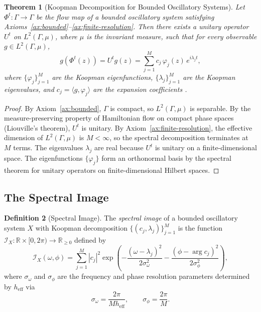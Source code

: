 \documentclass[11pt,twocolumn,a4paper]{article}
\newtheorem{theorem}{Theorem}[section]
\theoremstyle{definition}
\newtheorem{definition}[theorem]{Definition}
\theoremstyle{remark}
\newcommand{\R}{\mathbb{R}}
\begin{document}
\begin{theorem}[Koopman Decomposition for Bounded Oscillatory Systems]\label{thm:koopman}
Let $\Phi^t : \Gamma \to \Gamma$ be the flow map of a bounded oscillatory system satisfying Axioms~\ref{ax:bounded}--\ref{ax:finite-resolution}.  Then there exists a unitary operator $U^t$ on $L^2(\Gamma, \mu)$, where $\mu$ is the invariant measure, such that for every observable $g \in L^2(\Gamma, \mu)$,
\begin{equation}\label{eq:koopman}
    g(\Phi^t(z)) = U^t g(z) = \sum_{j=1}^{M} c_j \, \varphi_j(z) \, e^{i\lambda_j t},
\end{equation}
where $\{\varphi_j\}_{j=1}^M$ are the Koopman eigenfunctions, $\{\lambda_j\}_{j=1}^M$ are the Koopman eigenvalues, and $c_j = \langle g, \varphi_j \rangle$ are the expansion coefficients \citep{koopman1931hamiltonian}.
\end{theorem}

\begin{proof}
By Axiom~\ref{ax:bounded}, $\Gamma$ is compact, so $L^2(\Gamma, \mu)$ is separable.  By the measure-preserving property of Hamiltonian flow on compact phase spaces (Liouville's theorem), $U^t$ is unitary.  By Axiom~\ref{ax:finite-resolution}, the effective dimension of $L^2(\Gamma, \mu)$ is $M < \infty$, so the spectral decomposition terminates at $M$ terms.  The eigenvalues $\lambda_j$ are real because $U^t$ is unitary on a finite-dimensional space.  The eigenfunctions $\{\varphi_j\}$ form an orthonormal basis by the spectral theorem for unitary operators on finite-dimensional Hilbert spaces.
\end{proof}

\subsection{The Spectral Image}

\begin{definition}[Spectral Image]\label{def:spectral-image}
The \emph{spectral image} of a bounded oscillatory system $X$ with Koopman decomposition $\{(c_j, \lambda_j)\}_{j=1}^M$ is the function $\mathcal{I}_X : \R \times [0, 2\pi) \to \R_{\geq 0}$ defined by
\begin{equation}\label{eq:spectral-image}
    \mathcal{I}_X(\omega, \phi) = \sum_{j=1}^{M} |c_j|^2 \exp\left(-\frac{(\omega - \lambda_j)^2}{2\sigma_\omega^2} - \frac{(\phi - \arg c_j)^2}{2\sigma_\phi^2}\right),
\end{equation}
where $\sigma_\omega$ and $\sigma_\phi$ are the frequency and phase resolution parameters determined by $h_{\mathrm{eff}}$ via
\begin{equation}\label{eq:resolution-params}
    \sigma_\omega = \frac{2\pi}{M h_{\mathrm{eff}}}, \qquad \sigma_\phi = \frac{2\pi}{M}.
\end{equation}
\end{definition}
\end{document}
